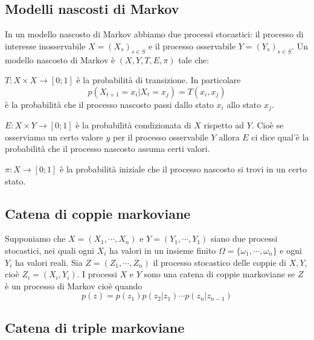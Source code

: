 \subsection{Modelli nascosti di Markov}

In un modello nascosto di Markov abbiamo due processi stocastici: il processo di interesse inosservabile $X=(X_{s})_{s\in S}$ e il processo osservabile $Y=(Y_{s})_{s\in S}$. Un modello nascosto di Markov \`e $(X, Y, T, E, \pi)$ tale che:
\begin{description}
  \item
    $T:X\times X\rightarrow [0;1]$ \`e la probabilit\`a di transizione. In particolare 
    \[	
      p(X_{t+1}=x_{i}| X_{t}=x_{j})=T(x_{i},x_{j})
    \] 
    \`e la probabilit\`a che il processo nascosto passi dallo stato $x_{i}$ allo stato $x_{j}$.
  \item
    $E:X\times Y \rightarrow [0;1]$ \`e la probabilit\`a condizionata di $X$ rispetto ad $Y$. Cio\`e se osserviamo un certo valore $y$ per il processo osservabile $Y$ allora $E$ ci dice qual'\`e la probabilit\`a che il processo nascosto assuma certi valori.
  \item
    $\pi:X\rightarrow [0;1]$ \`e la probabilit\`a iniziale che il processo nascosto si trovi in un certo stato.
\end{description}






\subsection{Catena di coppie markoviane}


Supponiamo che $X = (X_{1}, \cdots, X_{n})$ e $Y = (Y_{1}, \cdots, Y_{1})$ siano due processi stocastici, nei quali ogni $X_{i}$ ha valori in un insieme finito $\Omega=\{\omega_{1}, \cdots, \omega_{n}\}$ e ogni $Y_{i}$ ha valori reali. Sia $Z = (Z_{1}, \cdots, Z_{n})$ il processo stocastico delle coppie di $X,Y$, cio\`e $Z_{i}=(X_{i}, Y_{i})$. 
I processi $X$ e $Y$ sono una catena di coppie markoviane se $Z$ \`e un processo di Markov cio\`e quando 
\[
  p(z)=p(z_{1}) p(z_{2}|z_{1}) \cdots p(z_{n}|z_{n-1})
\]



\subsection{Catena di triple markoviane}

